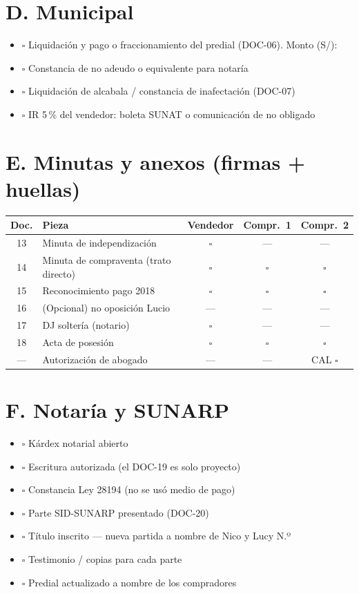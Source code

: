 \documentclass[12pt,a4paper]{article}
\begin{document}
\section*{D. Municipal}
\begin{itemize}[leftmargin=0.9cm]
\item $\square$ Liquidación y pago o fraccionamiento del predial (DOC-06). Monto (S/): \DeudaPredialReferencia
\item $\square$ Constancia de no adeudo o equivalente para notaría
\item $\square$ Liquidación de alcabala / constancia de inafectación (DOC-07)
\item $\square$ IR 5\,\% del vendedor: boleta SUNAT o comunicación de no obligado
\end{itemize}

\section*{E. Minutas y anexos (firmas + huellas)}
{\small\renewcommand{\arraystretch}{1.18}
\noindent\begin{tabularx}{\linewidth}{@{}c >{\raggedright\arraybackslash}X c c c@{}}
\toprule
Doc. & Pieza & Vendedor & Compr.\ 1 & Compr.\ 2 \\
\midrule
13 & Minuta de independización & $\square$ & --- & --- \\
14 & Minuta de compraventa (trato directo) & $\square$ & $\square$ & $\square$ \\
15 & Reconocimiento pago 2018 & $\square$ & $\square$ & $\square$ \\
16 & (Opcional) no oposición Lucio & --- & --- & --- \\
17 & DJ soltería (notario) & $\square$ & --- & --- \\
18 & Acta de posesión & $\square$ & $\square$ & $\square$ \\
--- & Autorización de abogado & --- & --- & CAL $\square$ \\
\bottomrule
\end{tabularx}}

\section*{F. Notaría y SUNARP}
\begin{itemize}[leftmargin=0.9cm]
\item $\square$ Kárdex notarial abierto
\item $\square$ Escritura autorizada (el DOC-19 es solo proyecto)
\item $\square$ Constancia Ley 28194 (no se usó medio de pago)
\item $\square$ Parte SID-SUNARP presentado (DOC-20)
\item $\square$ Título inscrito --- nueva partida a nombre de Nico y Lucy N.º\ \linea[4.2cm]
\item $\square$ Testimonio / copias para cada parte
\item $\square$ Predial actualizado a nombre de los compradores
\end{itemize}
\end{document}
